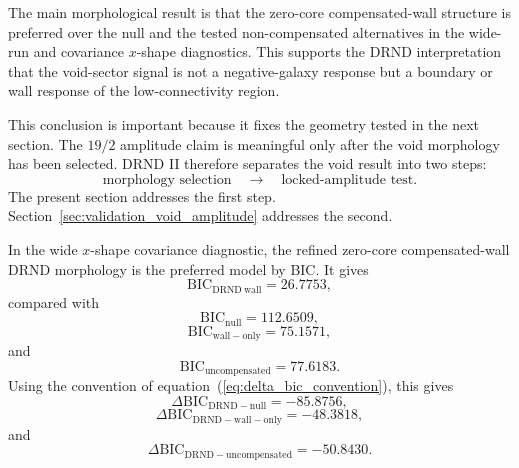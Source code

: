 \documentclass[12pt]{iopart}
\begin{document}
The main morphological result is that the zero-core compensated-wall structure is preferred over the null and the tested non-compensated alternatives in the wide-run and covariance \(x\)-shape diagnostics. This supports the DRND interpretation that the void-sector signal is not a negative-galaxy response but a boundary or wall response of the low-connectivity region.

This conclusion is important because it fixes the geometry tested in the next section. The \(19/2\) amplitude claim is meaningful only after the void morphology has been selected. DRND II therefore separates the void result into two steps:
\begin{equation}
\textrm{morphology selection}
\quad\longrightarrow\quad
\textrm{locked-amplitude test}.
\end{equation}
The present section addresses the first step. Section~\ref{sec:validation_void_amplitude} addresses the second.

In the wide \(x\)-shape covariance diagnostic, the refined zero-core compensated-wall DRND morphology is the preferred model by BIC. It gives
\begin{equation}
\mathrm{BIC}_{\mathrm{DRND\ wall}}=26.7753,
\end{equation}
compared with
\begin{equation}
\mathrm{BIC}_{\mathrm{null}}=112.6509,
\end{equation}
\begin{equation}
\mathrm{BIC}_{\mathrm{wall-only}}=75.1571,
\end{equation}
and
\begin{equation}
\mathrm{BIC}_{\mathrm{uncompensated}}=77.6183.
\end{equation}
Using the convention of equation~(\ref{eq:delta_bic_convention}), this gives
\begin{equation}
\Delta\mathrm{BIC}_{\mathrm{DRND-null}}=-85.8756,
\end{equation}
\begin{equation}
\Delta\mathrm{BIC}_{\mathrm{DRND-wall-only}}=-48.3818,
\end{equation}
and
\begin{equation}
\Delta\mathrm{BIC}_{\mathrm{DRND-uncompensated}}=-50.8430.
\end{equation}
\end{document}
